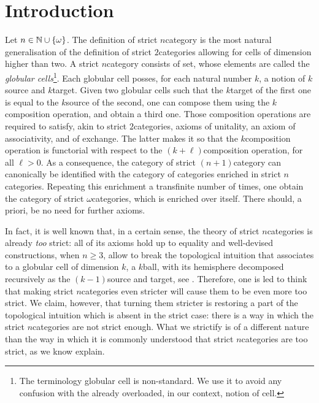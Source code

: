 \section{Introduction}

Let \( n \in \mathbb{N} \cup \left\{ {\omega} \right\} \).
The definition of strict \( n \)\nbd category is the most natural generalisation of the definition of strict \( 2 \)\nbd categories allowing for cells of dimension higher than two.
A strict \( n \)\nbd category \cite{brown1981groupoids} consists of set, whose elements are called the \emph{globular cells}\footnote{The terminology globular cell is non-standard. We use it to avoid any confusion with the already overloaded, in our context, notion of cell.}.
Each globular cell posses, for each natural number \( k \), a notion of \( k \)\nbd source and \( k \)\nbd target. 
Given two globular cells such that the \( k \)\nbd target of the first one is equal to the \( k \)\nbd source of the second, one can compose them using the \( k \)\nbd composition operation, and obtain a third one.
Those composition operations are required to satisfy, akin to strict \( 2 \)\nbd categories, axioms of unitality, an axiom of associativity, and of exchange.
The latter makes it so that the \( k \)\nbd composition operation is functorial with respect to the \( (k + \ell) \)\nbd composition operation, for all \( \ell > 0 \).
As a consequence, the category of strict \( (n + 1) \)\nbd category can canonically be identified with the category of categories enriched in strict \( n \)\nbd categories. 
Repeating this enrichment a transfinite number of times, one obtain the category of strict \( \omega \)\nbd categories, which is enriched over itself.
There should, a priori, be no need for further axioms.   

In fact, it is well known that, in a certain sense, the theory of strict \( n \)\nbd categories is already \emph{too} strict: all of its axioms hold up to equality and well-devised constructions, when \( n \geq 3 \), allow to break the topological intuition that associates to a globular cell of dimension \( k \), a \( k \)\nbd ball, with its hemisphere decomposed recursively as the \( (k - 1) \)\nbd source and target, see \cite{simpson1998homotopy}.
Therefore, one is led to think that making strict \( n \)\nbd categories even stricter will cause them to be even more too strict.
We claim, however, that turning them stricter is restoring a part of the topological intuition which is absent in the strict case: there is a way in which the strict \( n \)\nbd categories are not strict enough.
What we strictify is of a different nature than the way in which it is commonly understood that strict \( n \)\nbd categories are too strict, as we know explain.

